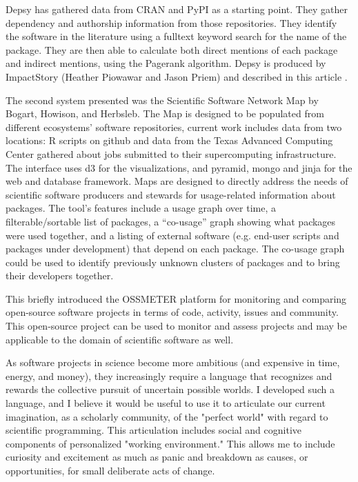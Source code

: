 \documentclass[a4paper,UKenglish]{dagrep}
\begin{document}
Depsy has gathered data from CRAN and PyPI as a starting point. They gather dependency and authorship information from those repositories. They identify the software in the literature using a fulltext keyword search for the name of the package. They are then able to calculate both direct mentions of each package and indirect mentions, using the Pagerank algorithm.  Depsy is produced by ImpactStory (Heather Piowawar and Jason Priem) and described in this article \cite{singh_chawla_unsung_2016}.

The second system presented was the Scientific Software Network Map by Bogart, Howison, and Herbsleb. The Map is designed to be populated from different ecosystems' software repositories, current work includes data from two locations: R scripts on github and data from the Texas Advanced Computing Center gathered about jobs submitted to their supercomputing infrastructure.  The interface uses d3 for the visualizations, and pyramid, mongo and jinja for the web and database framework. Maps are designed to directly address the needs of scientific software producers and stewards for usage-related information about packages. The tool's features include a usage graph over time, a filterable/sortable list of packages, a ``co-usage'' graph showing what packages were used together, and a listing of external software (e.g. end-user scripts and packages under development) that depend on each package. The co-usage graph could be used to identify previously unknown clusters of packages and to bring their developers together.


This briefly introduced the OSSMETER platform for monitoring and comparing open-source software projects in terms of code, activity, issues and community. This open-source project can be used to monitor and assess projects and may be applicable to the domain of scientific software as well.


As software projects in science become more ambitious (and expensive in time, energy, and money), they increasingly require a language that recognizes and rewards the collective pursuit of uncertain possible worlds. I developed such a language, and I believe it would be useful to use it to articulate our current imagination, as a scholarly community, of the "perfect world" with regard to scientific programming. This articulation includes social and cognitive components of personalized "working environment." This allows me to include curiosity and excitement as much as panic and breakdown as causes, or opportunities, for small deliberate acts of change.
\end{document}
